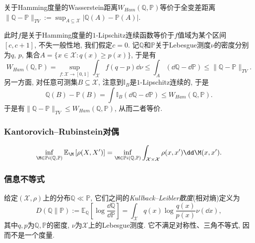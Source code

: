 \begin{example}[Hamming度量和全变差距离]
	关于Hamming度量的Wasserstein距离$W_{Ham}(\mathbb{Q}, \mathbb{P})$等价于全变差距离$\|\mathbb{Q} - \mathbb{P}\|_{TV} := \sup_{A \subseteq \mathcal{X}} |\mathbb{Q}(A) - \mathbb{P}(A)|$. 
	
	此时$f$是关于Hamming度量的$1$-Lipschitz连续函数等价于$f$值域为某个区间$[c, c+1]$, 不失一般性地, 我们假定$c = 0$. 
	记$\mathbb{Q}$和$\mathbb{P}$关于Lebesgue测度$\nu$的密度分别为$q$, $p$, 集合$A = \{x \in \mathcal{X} \colon q(x) \geq p(x)\} $, 于是有
	\begin{equation*}
		W_{Ham}(\mathbb{Q}, \mathbb{P})
		= \sup_{f \colon \mathcal{X} \to [0, 1]} \int_{\mathcal{X}} f (q - p) \dd \nu 
		\leq \int_A (\dd \mathbb{Q} - \dd \mathbb{P})
		\leq \|\mathbb{Q} - \mathbb{P}\|_{TV}. 
	\end{equation*}
	另一方面, 对任意可测集$B \subseteq \mathcal{X}$, 注意到$\mathbb{I}_B$是$1$-Lipschitz连续的, 于是
	\begin{equation*}
		\mathbb{Q}(B) - \mathbb{P}(B) 
		= \int \mathbb{I}_B (\dd \mathbb{Q} - \dd \mathbb{P}) 
		\leq W_{Ham}(\mathbb{Q}, \mathbb{P}). 
	\end{equation*}
	于是有$\|\mathbb{Q} - \mathbb{P}\|_{TV} \leq W_{Ham}(\mathbb{Q}, \mathbb{P})$, 从而二者等价. 
\end{example}

\subsubsection{Kantorovich–Rubinstein对偶}

\begin{equation*}
	\inf_{\M \in \mathbb{P}i(\mathbb{Q}, \mathbb{P})} \mathbb{E}_{\M} \left[ \rho(X, X') \right]
	= \inf_{\M \in \mathbb{P}i(\mathbb{Q}, \mathbb{P})} \int_{\mathcal{X} \times \mathcal{X}} \rho(x, x') \dd \M(x, x'). 
\end{equation*}

\subsubsection{信息不等式}

给定$(\mathcal{X}, \rho)$上的分布$\mathbb{Q} \ll \mathbb{P}$, 它们之间的\emph{Kullback–Leibler散度}(相对熵)定义为
\begin{equation}
	D(\mathbb{Q} \| \mathbb{P})
	:= \mathbb{E}_{\mathbb{Q}} \left[ \log \frac{\dd \mathbb{Q}}{\dd \mathbb{P}} \right]
	= \int_{\mathcal{X}} q(x) \log \frac{q(x)}{p(x)} \nu(\dd x), 
\end{equation}
其中$q, p$为$\mathbb{Q}, \mathbb{P}$的密度, $\nu$为$\mathcal{X}$上的Lebesgue测度. 
它不满足对称性、三角不等式, 因而不是一个度量. 
 
